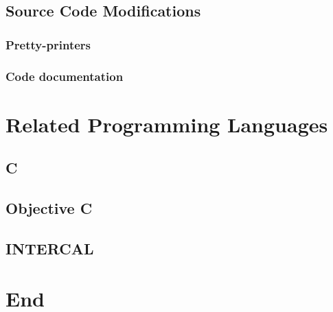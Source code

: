 \documentclass[11pt,twoside]{book}
\begin{document}
\chapter{Source Code Modifications}

\section{Pretty-printers}

\section{Code documentation}



\part{Related Programming Languages}

\chapter{C}

\chapter{Objective C}

\chapter{INTERCAL}


\part{End}



\end{document}

